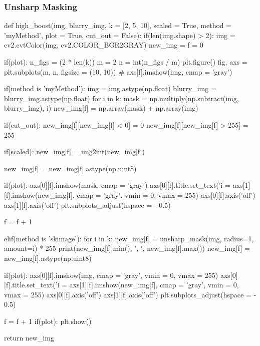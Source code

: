 \documentclass{article}
\begin{document}
\subsubsection{Unsharp Masking}
\label{cod:high_boost}
\begin{python}
def high_boost(img, blurry_img, k = [2, 5, 10], scaled = True, method = 'myMethod', plot = True, cut_out = False):
	if(len(img.shape) > 2):
		img = cv2.cvtColor(img, cv2.COLOR_BGR2GRAY)
	new_img = {}
	f = 0
	
	if(plot):
		n_figs = (2 * len(k))
		m = 2
		n = int(n_figs / m)
		plt.figure()
		fig, axs = plt.subplots(m, n, figsize = (10, 10))
		# axs[f].imshow(img, cmap = 'gray')
	
	if(method is 'myMethod'):
	img = img.astype(np.float)
	blurry_img = blurry_img.astype(np.float)
	for i in k:
		mask = np.multiply(np.subtract(img, blurry_img), i)
		new_img[f] = np.array(mask) + np.array(img)
	
		if(cut_out):
			new_img[f][new_img[f] < 0] = 0
			new_img[f][new_img[f] > 255] = 255
			
		if(scaled):
			new_img[f] = img2int(new_img[f])
			
		new_img[f] = new_img[f].astype(np.uint8)
		
		if(plot):
			axs[0][f].imshow(mask, cmap = 'gray')
			axs[0][f].title.set_text('i = %
			axs[1][f].imshow(new_img[f], cmap = 'gray', vmin = 0, vmax = 255)
			axs[0][f].axis('off')
			axs[1][f].axis('off')
			plt.subplots_adjust(hspace = - 0.5)
		
		f = f + 1
	
	elif(method is 'skimage'):
		for i in k:
			new_img[f] = unsharp_mask(img, radius=1, amount=i) * 255
			print(new_img[f].min(), ', ', new_img[f].max())
			new_img[f] = new_img[f].astype(np.uint8)
			
		if(plot):
			axs[0][f].imshow(img, cmap = 'gray', vmin = 0, vmax = 255)
			axs[0][f].title.set_text('i = %
			axs[1][f].imshow(new_img[f], cmap = 'gray', vmin = 0, vmax = 255)
			axs[0][f].axis('off')
			axs[1][f].axis('off')
			plt.subplots_adjust(hspace = - 0.5)
			
		f = f + 1
	if(plot):
		plt.show()
		
	return new_img
\end{python}
\end{document}
